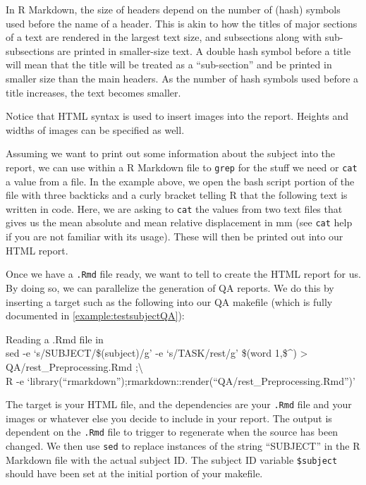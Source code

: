 In R Markdown, the size of headers depend on the number of \mypound (hash) symbols used before the name of a header. This is akin to how the titles of major sections of a text are rendered in the largest text size, and subsections along with sub-subsections are printed in smaller-size text. A double hash symbol before a title will mean that the title will be treated as a ``sub-section'' and be printed in smaller size than the main headers. As the number of hash symbols used before a title increases, the text becomes smaller.

Notice that HTML syntax is used to insert images into the report. Heights and widths of images can be specified as well. 

Assuming we want to print out some information about the subject into the report, we can use \bashn{} within a R Markdown file to \texttt{grep} for the stuff we need or \texttt{cat} a value from a file. In the example above, we open the bash script portion of the file with three backticks and a curly bracket telling R that the following text is written in \bashn{} code. Here, we are asking \bashn{} to \texttt{cat} the values from two text files that gives us the mean absolute and mean relative displacement in mm (see \texttt{cat} help if you are not familiar with its usage). These will then be printed out into our HTML report.

Once we have a \texttt{.Rmd} file ready, we want to tell \maken{} to create the HTML report for us. By doing so, we can parallelize the generation of QA reports. We do this by inserting a target such as the following into our QA makefile (which is fully documented in \autoref{example:testsubjectQA}):

\begin{make}{Reading a .Rmd file in \maken{}}{}
 \\
\tab sed -e `s/SUBJECT/\$(subject)/g' -e `s/TASK/rest/g' \$(word 1,\$\textasciicircum{}) > QA/rest\_Preprocessing.Rmd ;\textbackslash{} \\
\tab R -e `library(``rmarkdown'');rmarkdown::render(``QA/rest\_Preprocessing.Rmd'')' \\
\end{make}

The target is your HTML file, and the dependencies are your \texttt{.Rmd} file and your images or whatever else you decide to include in your report. The output is dependent on the \texttt{.Rmd} file to trigger to regenerate when the source has been changed. We then use \texttt{sed} to replace instances of the string ``SUBJECT'' in the R Markdown file with the actual subject ID. The subject ID variable \texttt{\$subject} should have been set at the initial portion of your makefile. 

